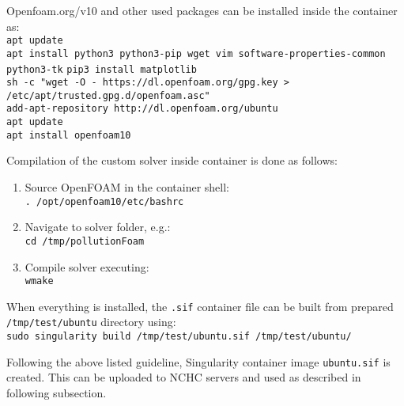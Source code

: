 Openfoam.org/v10 and other used packages can be installed inside the container as:\\[0.2cm]
    \indent\quad\quad\texttt{apt update}\\[0.2cm]
    \indent\quad\quad\texttt{apt install python3 python3-pip wget vim software-properties-common \\ \indent\quad\quad\quad\quad python3-tk}
    \indent\quad\quad\texttt{pip3 install matplotlib}\\[0.2cm]
    \indent\quad\quad\texttt{sh -c "wget -O - https://dl.openfoam.org/gpg.key >} \\ \indent\quad\quad\quad\quad\texttt{/etc/apt/trusted.gpg.d/openfoam.asc"}\\[0.2cm]
    \indent\quad\quad\texttt{add-apt-repository http://dl.openfoam.org/ubuntu}\\[0.2cm]
    \indent\quad\quad\texttt{apt update}\\[0.2cm]
    \indent\quad\quad\texttt{apt install openfoam10}

Compilation of the custom solver inside container is done as follows:
\begin{enumerate}
    \item Source OpenFOAM in the container shell:\\[0.2cm] 
    \texttt{. /opt/openfoam10/etc/bashrc}
    \item Navigate to solver folder, e.g.:\\[0.2cm] 
    \texttt{cd /tmp/pollutionFoam} 
    \item Compile solver executing: \\[0.2cm] 
    \texttt{wmake}
\end{enumerate}

When everything is installed, the \texttt{.sif} container file can be built from prepared \texttt{/tmp/test/ubuntu} directory using:\\[0.2cm] 
\indent\quad\quad\texttt{sudo singularity build /tmp/test/ubuntu.sif /tmp/test/ubuntu/}

Following the above listed guideline, Singularity container image \texttt{ubuntu.sif} is created. This can be uploaded to NCHC servers and used as described in following subsection. 

